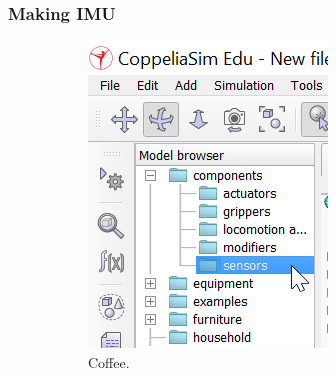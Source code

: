 \subsubsection{Making IMU}








\begin{figure}[h!]
  \centering
  \begin{subfigure}[b]{0.4\linewidth}
    \includegraphics[width=\linewidth]{figures/selecting_sensor_componant.png}
    \caption{Coffee.}
  \end{subfigure}
  \begin{subfigure}[b]{0.4\linewidth}

\end{subfigure}
\end{figure}
